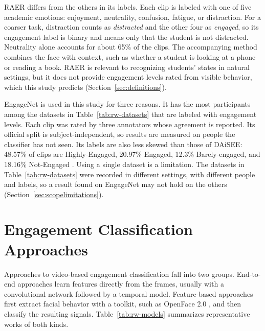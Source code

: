 RAER \cite{zhao2025} differs from the others in its labels. Each clip is labeled with one of five academic emotions: enjoyment, neutrality, confusion, fatigue, or distraction. For a coarser task, distraction counts as \emph{distracted} and the other four as \emph{engaged}, so its engagement label is binary and means only that the student is not distracted. Neutrality alone accounts for about 65\% of the clips. The accompanying method combines the face with context, such as whether a student is looking at a phone or reading a book. RAER is relevant to recognizing students' states in natural settings, but it does not provide engagement levels rated from visible behavior, which this study predicts (Section~\ref{sec:definitions}).

EngageNet \cite{singh2023} is used in this study for three reasons. It has the most participants among the datasets in Table~\ref{tab:rw-datasets} that are labeled with engagement levels. Each clip was rated by three annotators whose agreement is reported. Its official split is subject-independent, so results are measured on people the classifier has not seen. Its labels are also less skewed than those of DAiSEE: 48.57\% of clips are Highly-Engaged, 20.97\% Engaged, 12.3\% Barely-engaged, and 18.16\% Not-Engaged \cite{singh2023}. Using a single dataset is a limitation. The datasets in Table~\ref{tab:rw-datasets} were recorded in different settings, with different people and labels, so a result found on EngageNet may not hold on the others (Section~\ref{sec:scopelimitations}).



\section{Engagement Classification Approaches}
\label{sec:rw-models}

Approaches to video-based engagement classification fall into two groups. End-to-end approaches learn features directly from the frames, usually with a convolutional network followed by a temporal model. Feature-based approaches first extract facial behavior with a toolkit, such as OpenFace 2.0 \cite{baltrusaitis2018}, and then classify the resulting signals. Table~\ref{tab:rw-models} summarizes representative works of both kinds.

